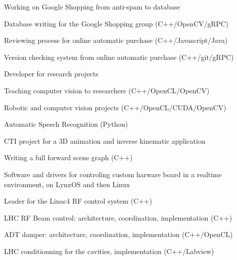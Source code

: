 \documentclass[a4paper]{deedy-resume} %
\begin{document}
\begin{minipage}[t]{0.66\textwidth}
	Working on Google Shopping from anti-spam to database
	\begin{tightitemize}
		\item Database writing for the Google Shopping group (C++/OpenCV/gRPC)
		\item Reviewing process for online automatic purchase (C++/Javascript/Java)
		\item Version checking system from online automatic purchase (C++/git/gRPC)
	\end{tightitemize}

\sectionspace %


	Developer for research projects
	\begin{tightitemize}
		\item Teaching computer vision to researchers (C++/OpenCL/OpenCV)
		\item Robotic and computer vision projects (C++/OpenCL/CUDA/OpenCV)
		\item Automatic Speech Recognition (Python)
	\end{tightitemize}

\sectionspace %


	CTI project for a 3D animation and inverse kinematic application
	\begin{tightitemize}
		\item Writing a full forward scene graph (C++)
	\end{tightitemize}

\sectionspace %


	Software and drivers for controling custom harware board in a realtime
	environment, on LynxOS and then Linux
	\begin{tightitemize}
		\item Leader for the Linac4 RF control system (C++)
		\item LHC RF Beam control: architecture, coordination, implementation (C++)
		\item ADT damper: architecture, coordination, implementation (C++/OpenCL)
		\item LHC conditionning for the cavities, implementation (C++/Labview)
	\end{tightitemize}


\end{minipage}
\end{document}
